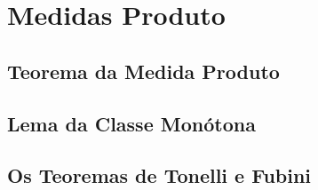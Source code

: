 \chapter{Medidas Produto}

\section{Teorema da Medida Produto}

\section{Lema da Classe Monótona}

\section{Os Teoremas de Tonelli e Fubini}